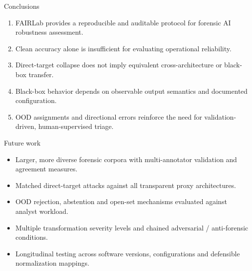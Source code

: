 \documentclass{beamer}
\begin{document}

\begin{frame}{Conclusions}

\begin{enumerate}
    \item FAIRLab provides a reproducible and auditable protocol for forensic AI robustness assessment.
    \item Clean accuracy alone is insufficient for evaluating operational reliability.
    \item Direct-target collapse does not imply equivalent cross-architecture or black-box transfer.
    \item Black-box behavior depends on observable output semantics and documented configuration.
    \item OOD assignments and directional errors reinforce the need for validation-driven, human-supervised triage.
\end{enumerate}

\end{frame}


\begin{frame}{Future work}

\begin{itemize}
    \item Larger, more diverse forensic corpora with multi-annotator validation and agreement measures.
    \item Matched direct-target attacks against all transparent proxy architectures.
    \item OOD rejection, abstention and open-set mechanisms evaluated against analyst workload.
    \item Multiple transformation severity levels and chained adversarial / anti-forensic conditions.
    \item Longitudinal testing across software versions, configurations and defensible normalization mappings.
\end{itemize}

\end{frame}

\backmatter
\end{document}
